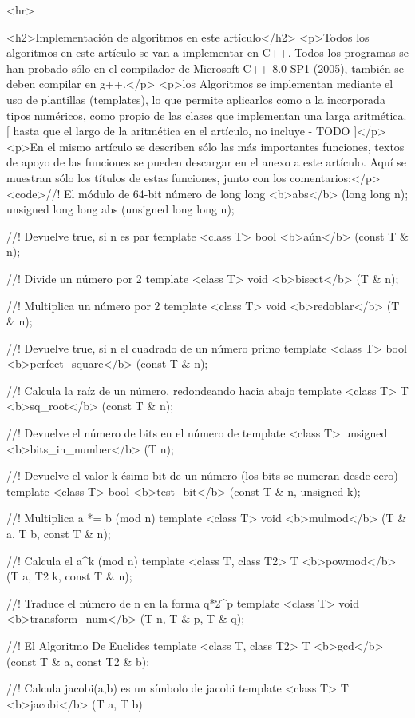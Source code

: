 <hr>

<h2>Implementación de algoritmos en este artículo</h2>
<p>Todos los algoritmos en este artículo se van a implementar en C++. Todos los programas se han probado sólo en el compilador de Microsoft C++ 8.0 SP1 (2005), también se deben compilar en g++.</p>
<p>los Algoritmos se implementan mediante el uso de plantillas (templates), lo que permite aplicarlos como a la incorporada tipos numéricos, como propio de las clases que implementan una larga aritmética. [ hasta que el largo de la aritmética en el artículo, no incluye - TODO ]</p>
<p>En el mismo artículo se describen sólo las más importantes funciones, textos de apoyo de las funciones se pueden descargar en el anexo a este artículo. Aquí se muestran sólo los títulos de estas funciones, junto con los comentarios:</p>
<code>//! El módulo de 64-bit número de
long long <b>abs</b> (long long n);
unsigned long long abs (unsigned long long n);

//! Devuelve true, si n es par
template <class T>
bool <b>aún</b> (const T & n);

//! Divide un número por 2
template <class T>
void <b>bisect</b> (T & n);

//! Multiplica un número por 2
template <class T>
void <b>redoblar</b> (T & n);

//! Devuelve true, si n el cuadrado de un número primo
template <class T>
bool <b>perfect_square</b> (const T & n);

//! Calcula la raíz de un número, redondeando hacia abajo
template <class T>
T <b>sq_root</b> (const T & n);

//! Devuelve el número de bits en el número de
template <class T>
unsigned <b>bits_in_number</b> (T n);

//! Devuelve el valor k-ésimo bit de un número (los bits se numeran desde cero)
template <class T>
bool <b>test_bit</b> (const T & n, unsigned k);

//! Multiplica a *= b (mod n)
template <class T>
void <b>mulmod</b> (T & a, T b, const T & n);

//! Calcula el a^k (mod n)
template <class T, class T2>
T <b>powmod</b> (T a, T2 k, const T & n);

//! Traduce el número de n en la forma q*2^p
template <class T>
void <b>transform_num</b> (T n, T & p, T & q);

//! El Algoritmo De Euclides
template <class T, class T2>
T <b>gcd</b> (const T & a, const T2 & b);

//! Calcula jacobi(a,b) es un símbolo de jacobi
template <class T>
T <b>jacobi</b> (T a, T b)

